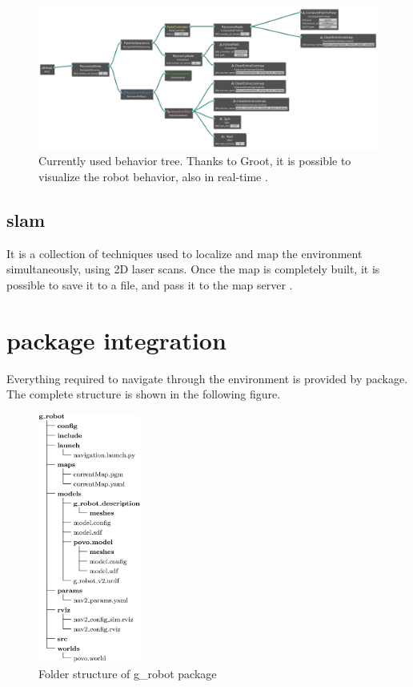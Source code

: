 \begin{figure}[h]
    \centering
    \includegraphics[width=\textwidth]{images/bt-alpha.png}
    \caption{Currently used behavior tree. Thanks to Groot, it is possible to visualize the robot behavior, also in real-time \cite{groot}.}
\end{figure}

\subsection*{\Acrfull{slam}}

It is a collection of techniques used to localize and map the environment simultaneously, using 2D laser scans. Once the map is completely built, it is possible to save it to a file, and pass it to the map server \cite{slam}.

\section{ package integration}

Everything required to navigate through the environment is provided by  package. The complete structure is shown in the following figure.

\begin{figure}
  \captionsetup{singlelinecheck = false, format= hang, justification=raggedright, font=footnotesize, labelsep=space}
  \includegraphics[width=0.3\textwidth]{images/g-robot}
  \caption{Folder structure of g\_robot package}
\end{figure}

